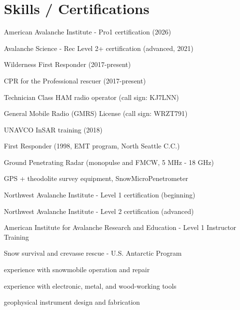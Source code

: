 \documentclass[11pt]{article}
\renewenvironment{itemize}{
  \begin{list}{}{
    \setlength{\leftmargin}{1.5em}
    \setlength{\itemsep}{0pt}
    \setlength{\parskip}{0pt}
  }
}{
  \end{list}
}
\begin{document}
\section*{Skills / Certifications}
\begin{itemize}
\item American Avalanche Institute - Pro1 certification (2026)
\item Avalanche Science - Rec Level 2+ certification (advanced, 2021)
\item Wilderness First Responder (2017-present)
\item CPR for the Professional rescuer (2017-present)
\item Technician Class HAM radio operator (call sign: KJ7LNN)
\item General Mobile Radio (GMRS) License (call sign: WRZT791)
\item UNAVCO InSAR training (2018)
\item First Responder (1998, EMT program, North Seattle C.C.)
\item Ground Penetrating Radar (monopulse and FMCW, 5 MHz - 18 GHz)
\item GPS + theodolite survey equipment, SnowMicroPenetrometer
\item Northwest Avalanche Institute - Level 1 certification (beginning)
\item Northwest Avalanche Institute - Level 2 certification (advanced)
\item American Institute for Avalanche Research and Education - Level 1 Instructor Training
\item Snow survival and crevasse rescue - U.S. Antarctic Program
\item experience with snowmobile operation and repair
\item experience with electronic, metal, and wood-working tools
\item geophysical instrument design and fabrication
\end{itemize}
\end{document}
